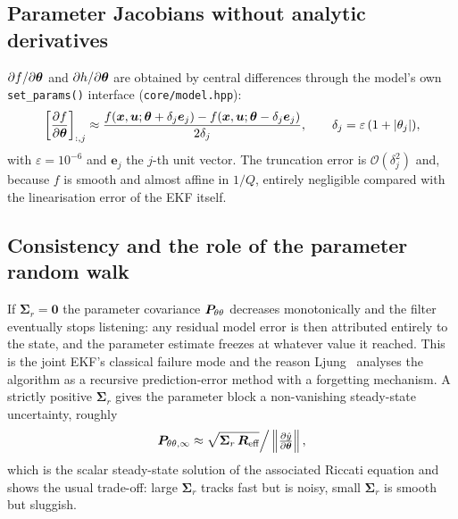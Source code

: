 \subsection{Parameter Jacobians without analytic derivatives}
$\partial f/\partial\bm{\theta}$ and $\partial h/\partial\bm{\theta}$ are obtained by central differences
through the model's own \texttt{set\_params()} interface (\texttt{core/model.hpp}):
\begin{equation}
\left[\frac{\partial f}{\partial \bm{\theta}}\right]_{:,j}
\approx\frac{f(\bm{x},\bm{u};\bm{\theta}+\delta_j \bm{e}_j)-f(\bm{x},\bm{u};\bm{\theta}-\delta_j \bm{e}_j)}{2\delta_j},
\qquad \delta_j=\varepsilon\,(1+|\theta_j|),
\label{eq:je-fd}
\end{equation}
with $\varepsilon=10^{-6}$ and $\bm{e}_j$ the $j$-th unit vector.  The truncation error is
$\mathcal{O}(\delta_j^2)$ and, because $f$ is smooth and almost affine in $1/Q$, entirely
negligible compared with the linearisation error of the EKF itself.

\subsection{Consistency and the role of the parameter random walk}
If $\bm{\Sigma}_r=\bm{0}$ the parameter covariance $\bm{P}_{\theta\theta}$ decreases monotonically and
the filter eventually stops listening: any residual model error is then attributed entirely to the
state, and the parameter estimate freezes at whatever value it reached.  This is the joint EKF's
classical failure mode and the reason Ljung~\cite{ljung1979ekf} analyses the algorithm as a
recursive prediction-error method with a forgetting mechanism.  A strictly positive $\bm{\Sigma}_r$
gives the parameter block a non-vanishing steady-state uncertainty, roughly
\begin{equation}
\bm{P}_{\theta\theta,\infty}\approx\sqrt{\bm{\Sigma}_r\,\bm{R}_\text{eff}}\Big/\left\|\tfrac{\partial \hat{y}}{\partial\bm{\theta}}\right\| ,
\label{eq:je-steady}
\end{equation}
which is the scalar steady-state solution of the associated Riccati equation and shows the usual
trade-off: large $\bm{\Sigma}_r$ tracks fast but is noisy, small $\bm{\Sigma}_r$ is smooth but
sluggish.

